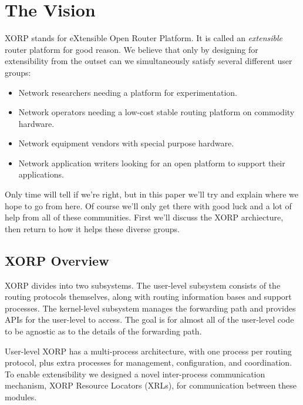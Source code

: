 \section{The Vision}

XORP stands for eXtensible Open Router Platform.  It is called an {\it
extensible} router platform for good reason.  We believe that only by
designing for extensibility from the outset can we simultaneously
satisfy several different user groups:
\begin{itemize}
\vspace{-0.07in}
\item Network researchers needing a platform for experimentation.
\vspace{-0.07in}
\item Network operators needing a low-cost stable routing platform on
commodity hardware.
\vspace{-0.07in}
\item Network equipment vendors with special purpose hardware.
\vspace{-0.07in}
\item Network application writers looking for an open platform to
support their applications.
\end{itemize}
\vspace{-0.05in}
Only time will tell if we're right, but in this paper we'll try and
explain where we hope to go from here.  Of course we'll only get there
with good luck and a lot of help from all of these communities.  First
we'll discuss the XORP archiecture, then return to how it helps these
diverse groups.

\subsection{XORP Overview}

XORP divides into two subsystems. The user-level subsystem consists of the routing protocols themselves, along with routing
information bases and support processes. The kernel-level subsystem manages the forwarding path and provides APIs for the user-level to access. The goal is for almost all of the user-level code to be agnostic as to the details of the forwarding path.

User-level XORP has a multi-process architecture, with
one process per routing protocol, plus extra processes for management,
configuration, and coordination.  To enable extensibility we designed
a novel inter-process communication mechanism, XORP Resource
Locators (XRLs), for communication between these modules.  

